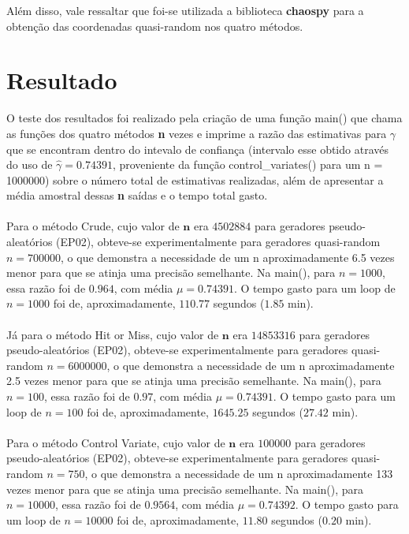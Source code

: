 \documentclass{article}
\begin{document}
Além disso, vale ressaltar que foi-se utilizada a biblioteca \textbf{chaospy} para a obtenção das coordenadas quasi-random nos quatro métodos.

\section{Resultado}

O teste dos resultados foi realizado pela criação de uma função main() que chama as funções dos quatro métodos \textbf{n} vezes e imprime a razão das estimativas para $\gamma$ que se encontram dentro do intevalo de confiança (intervalo esse obtido através do uso de $\hat{\gamma} = 0.74391$, proveniente da função control\_variates() para um n = 1000000) sobre o número total de estimativas realizadas, além de apresentar a média amostral dessas \textbf{n} saídas e o tempo total gasto.\\
\\
Para o método Crude, cujo valor de $\textbf{n}$ era $4502884$ para geradores pseudo-aleatórios (EP02), obteve-se experimentalmente para geradores quasi-random $n = 700000$, o que demonstra a necessidade de um n aproximadamente 6.5 vezes menor para que se atinja uma precisão semelhante. Na main(), para $n = 1000$, essa razão foi de $0.964$, com média $\mu = 0.74391$. O tempo gasto para um loop de $n = 1000$ foi de, aproximadamente, $110.77$ segundos ($1.85$ min).\\
\\
Já para o método Hit or Miss, cujo valor de $\textbf{n}$ era $14853316$ para geradores pseudo-aleatórios (EP02), obteve-se experimentalmente para geradores quasi-random $n = 6000000$, o que demonstra a necessidade de um n aproximadamente 2.5 vezes menor para que se atinja uma precisão semelhante. Na main(), para $n = 100$, essa razão foi de $0.97$, com média $\mu = 0.74391$. O tempo gasto para um loop de $n = 100$ foi de, aproximadamente, $1645.25$ segundos ($27.42$ min).\\
\\
Para o método Control Variate, cujo valor de $\textbf{n}$ era $100000$ para geradores pseudo-aleatórios (EP02), obteve-se experimentalmente para geradores quasi-random $n = 750$, o que demonstra a necessidade de um n aproximadamente 133 vezes menor para que se atinja uma precisão semelhante. Na main(), para $n = 10000$, essa razão foi de $0.9564$, com média $\mu = 0.74392$. O tempo gasto para um loop de $n = 10000$ foi de, aproximadamente, $11.80$ segundos ($0.20$ min).\\
\end{document}
